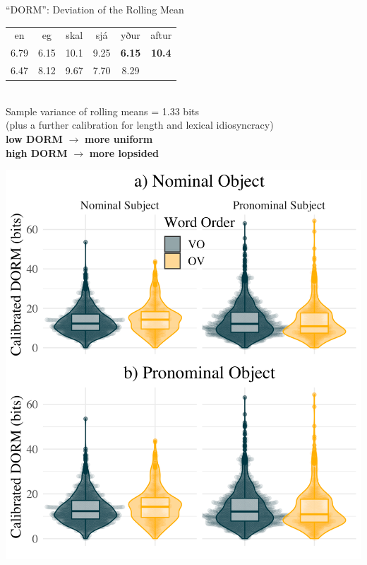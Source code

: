 \documentclass[hyperref={pdfpagelabels=false}]{beamer}
\begin{document}
\begin{frame}{``DORM'': Deviation of the Rolling Mean} 
	
	\begin{center}
		\begin{tabular}{c c c c c c}
			en & eg & skal & sjá & yður & aftur \\
			6.79 & 6.15 & 10.1 & 9.25 & \textbf{6.15} & \textbf{10.4}\\
			6.47 & 8.12 & 9.67 & 7.70 & 8.29 & \\
		\end{tabular} \\\vspace*{5mm}
		Sample variance of rolling means = 1.33 bits\\
		(plus a further calibration for length and lexical idiosyncracy)\\\vspace*{3mm}
		\textbf{low DORM} $\rightarrow$ \textbf{more uniform}\\
		\textbf{high DORM} $\rightarrow$ \textbf{more lopsided}
	\end{center}
	
\end{frame}








\begin{frame}%
	
	
	\begin{center}
	\includegraphics[scale = 0.58]{NewFigType3.png}
\end{center}
	
\end{frame}
\end{document}
